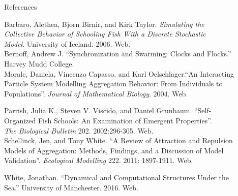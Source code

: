 \documentclass[final, xcolor=dvipsnames]{beamer}
\newlength{\onecolwid}
\begin{document}
\begin{frame}[t]
\begin{columns}[t]
\begin{column}{\onecolwid}
\begin{block}{References}

\footnotesize{
Barbaro, Alethea, Bjorn Birnir, and Kirk Taylor. \textit{Simulating the}\\
	\hspace{0.5cm}\textit{Collective Behavior of Schooling Fish With a Discrete Stochastic} \\
	\hspace{0.5cm} \textit{Model}. University of Iceland. 2006. Web. \\
	
	\noindent Bernoff, Andrew J. ``Synchronization and Swarming: Clocks and Flocks.'' \\
	\hspace{0.5cm} Harvey Mudd College. \\
	
	\noindent Morale, Daniela, Vincenzo Capasso, and Karl Oelschlager.``An Interacting \\
	\hspace{0.5cm} Particle System Modelling Aggregation Behavior: From Individuals to\\
	\hspace{0.5cm} Populations''. \textit{Journal of Mathematical Biology}. 2004. Web.
	
	\noindent Parrish, Julia K., Steven V. Viscido, and Daniel Grunbaum. ``Self-\\
	\hspace{0.5cm} Organized Fish Schools: An Examination of Emergent Properties''. \\  
	\hspace{0.5cm} \textit{The Biological Bulletin} 202. 2002:296-305. Web. \\
	
	\noindent Schellinck, Jen, and Tony White. ``A Review of Attraction and Repulsion\\
	\hspace{0.5cm} Models of Aggregation: Methods, Findings, and a Discussion of Model \\
	\hspace{0.5cm} Validation''. \textit{Ecological Modelling} 222. 2011: 1897-1911. Web.}
	
	\noindent White, Jonathan.  ``Dynamical and Computational Structures Under the\\
	\hspace{0.5cm} Sea.'' University of Manchester. 2016. Web.


\end{block}
\end{column}
\end{columns}
\end{frame}
\end{document}
